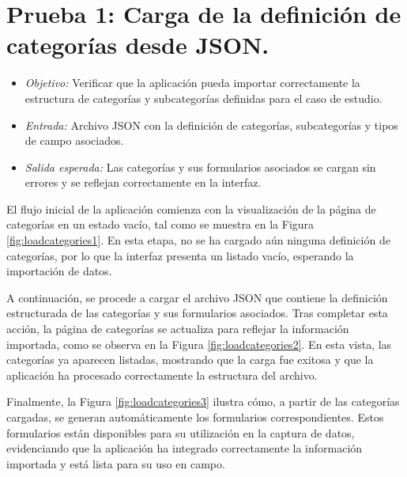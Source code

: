 \documentclass[12pt, a4paper]{book}
\begin{document}
\section{Prueba 1: Carga de la definición de categorías desde JSON.}
\begin{itemize}
    \item \textit{Objetivo:} Verificar que la aplicación pueda importar correctamente la estructura de categorías y subcategorías definidas para el caso de estudio.
    \item \textit{Entrada:} Archivo JSON con la definición de categorías, subcategorías y tipos de campo asociados.
    \item \textit{Salida esperada:} Las categorías y sus formularios asociados se cargan sin errores y se reflejan correctamente en la interfaz.
\end{itemize}

El flujo inicial de la aplicación comienza con la visualización de la página de categorías en un estado vacío, tal como se muestra en la Figura \ref{fig:loadcategories1}. En esta etapa, no se ha cargado aún ninguna definición de categorías, por lo que la interfaz presenta un listado vacío, esperando la importación de datos.

A continuación, se procede a cargar el archivo JSON que contiene la definición estructurada de las categorías y sus formularios asociados. Tras completar esta acción, la página de categorías se actualiza para reflejar la información importada, como se observa en la Figura \ref{fig:loadcategories2}. En esta vista, las categorías ya aparecen listadas, mostrando que la carga fue exitosa y que la aplicación ha procesado correctamente la estructura del archivo.

Finalmente, la Figura \ref{fig:loadcategories3} ilustra cómo, a partir de las categorías cargadas, se generan automáticamente los formularios correspondientes. Estos formularios están disponibles para su utilización en la captura de datos, evidenciando que la aplicación ha integrado correctamente la información importada y está lista para su uso en campo.
\end{document}
